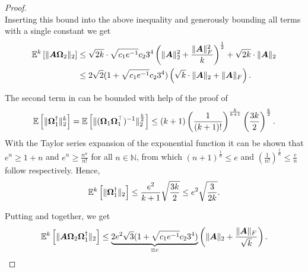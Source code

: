 \documentclass[12pt]{article}
\begin{document}
\begin{proof}
\begin{equation}
    \end{equation}
    Inserting this bound into the above inequality and generously bounding all terms with a single constant we get
    \begin{align}
        \mathbb{E}^{k}\left[ \lVert \boldsymbol{A} \boldsymbol{\Omega}_2 \rVert _2 \right]
        &\leq \sqrt{2k} \cdot \sqrt{c_1 e^{-1}} c_2 3^4 \left( \lVert \boldsymbol{A} \rVert _2^2  + \frac{\lVert \boldsymbol{A} \rVert _F^2}{k} \right)^{\frac{1}{2}} + \sqrt{2k} \cdot \lVert \boldsymbol{A} \rVert _2 \notag \\
        &\leq 2 \sqrt{2} (1 + \sqrt{c_1 e^{-1}} c_2 3^4)\left( \sqrt{k} \cdot \lVert \boldsymbol{A} \rVert _2  + \lVert \boldsymbol{A} \rVert _F \right).
        \label{equ:OSE-moment-bound-first}
    \end{align}

    The second term in  can be bounded with help of the proof of \cite[Lemma B.3]{tropp-2023-randomized-algorithms}
    \begin{equation}
        \mathbb{E}\left[ \lVert \boldsymbol{\Omega}_1^{\dagger} \rVert _2^{k} \right]
        = \mathbb{E}\left[ \lVert ( \boldsymbol{\Omega}_1 \boldsymbol{\Omega}_1^{\top} )^{-1} \rVert _2^{\frac{k}{2}} \right]
        \leq \left( k + 1 \right) \left( \frac{1}{(k + 1)!}\right)^{\frac{k}{k + 1}} \left( \frac{3 k}{2}\right)^{\frac{k}{2}}.
    \end{equation}
    With the Taylor series expansion of the exponential function it can be shown that $e^n \geq 1 + n$ and $e^n \geq \frac{n^n}{n!}$ for all $n \in \mathbb{N}$, from which $(n + 1)^{\frac{1}{n}} \leq e$ and $\left( \frac{1}{n!} \right)^{\frac{1}{n}} \leq \frac{e}{n}$ follow respectively. Hence,
    \begin{equation}
        \mathbb{E}^{k}\left[ \lVert \boldsymbol{\Omega}_1^{\dagger} \rVert _2 \right]
        \leq \frac{e^2}{k + 1}\sqrt{ \frac{3k}{2} }
        \leq e^2 \sqrt{\frac{3}{2k}}.
        \label{equ:OSE-moment-bound-second}
    \end{equation}

    Putting  and   together, we get
    \begin{equation}
        \mathbb{E}^{k}\left[ \lVert \boldsymbol{A} \boldsymbol{\Omega}_2 \boldsymbol{\Omega}_1^{\dagger} \rVert _2 \right]
        \leq \underbrace{2 e^2\sqrt{3} (1 + \sqrt{c_1 e^{-1}} c_2 3^4)}_{\equiv c}\left( \lVert \boldsymbol{A} \rVert _2  + \frac{\lVert \boldsymbol{A} \rVert _F}{\sqrt{k}} \right).
    \end{equation}

\end{proof}
\end{document}

